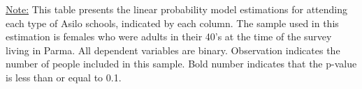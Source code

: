 \begin{footnotesize}
\noindent\underline{Note:} This table presents the linear probability model estimations for attending each type of Asilo schools, indicated by each column. The sample used in this estimation is females who were adults in their 40's at the time of the survey living in Parma. All dependent variables are binary. Observation indicates the number of people included in this sample. Bold number indicates that the p-value is less than or equal to 0.1.
\end{footnotesize}
